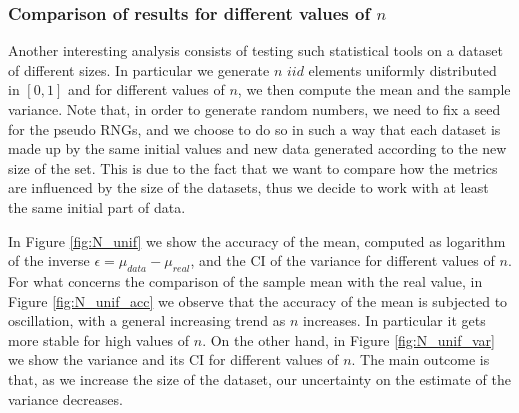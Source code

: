 \documentclass[twoside,onecolumn]{article}
\theoremstyle{definition}
\begin{document}
\subsubsection{Comparison of results for different values of $n$}
Another interesting analysis consists of testing such statistical tools on a dataset of different sizes. In particular we generate $n$ $iid$ elements uniformly distributed in $[0,1]$ and for different values of $n$, we then compute the mean and the sample variance. Note that, in order to generate random numbers, we need to fix a seed for the pseudo RNGs, and we choose to do so in such a way that each dataset is made up by the same initial values and new data generated according to the new size of the set. This is due to the fact that we want to compare how the metrics are influenced by the size of the datasets, thus we decide to work with at least the same initial part of data.\par
In Figure \ref{fig:N_unif} we show the accuracy of the mean, computed as logarithm of the inverse $\epsilon=\mu_{data}-\mu_{real}$, and the CI of the variance for different values of $n$. For what concerns the comparison of the sample mean with the real value, in Figure \ref{fig:N_unif_acc} we observe that the accuracy of the mean is subjected to oscillation, with a general increasing trend as $n$ increases. In particular it gets more stable for high values of $n$. On the other hand, in Figure \ref{fig:N_unif_var} we show the variance and its CI for different values of $n$. The main outcome is that, as we increase the size of the dataset, our uncertainty on the estimate of the variance decreases.
\end{document}
